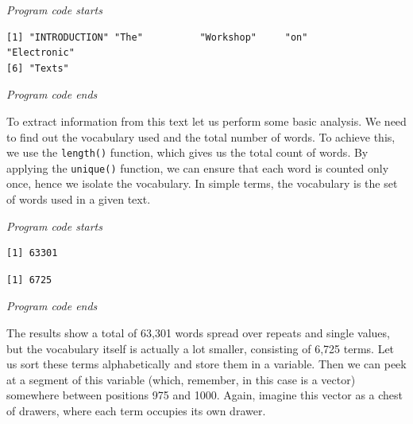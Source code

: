 \emph{Program code starts}

\begin{Shaded}
\begin{Highlighting}[]
\OtherTok{\textless{}{-}}\NormalTok{ etext[}\SpecialCharTok{!}\SpecialCharTok{==}\NormalTok{]}
\end{Highlighting}
\end{Shaded}

\begin{verbatim}
[1] "INTRODUCTION" "The"          "Workshop"     "on"           "Electronic"  
[6] "Texts"       
\end{verbatim}

\emph{Program code ends}

To extract information from this text let us perform some basic
analysis. We need to find out the vocabulary used and the total number
of words. To achieve this, we use the \texttt{length()} function, which
gives us the total count of words. By applying the
\texttt{unique()} function, we can ensure that each word is counted only
once, hence we isolate the vocabulary. In simple terms, the vocabulary is
the set of words used in a given text.

\emph{Program code starts}

\begin{Shaded}
\begin{Highlighting}[]
\end{Highlighting}
\end{Shaded}

\begin{verbatim}
[1] 63301
\end{verbatim}

\begin{Shaded}
\begin{Highlighting}[]
\NormalTok{(}
\end{Highlighting}
\end{Shaded}

\begin{verbatim}
[1] 6725
\end{verbatim}

\emph{Program code ends}

The results show a total of 63,301 words spread over repeats and single
values, but the vocabulary itself is actually a lot smaller, consisting of 6,725
terms. Let us sort these terms alphabetically and store them in a
variable. Then we can peek at a segment of this variable (which, remember,
in this case is a vector) somewhere between positions 975 and 1000.
Again, imagine this vector as a chest of drawers, where each term
occupies its own drawer.

